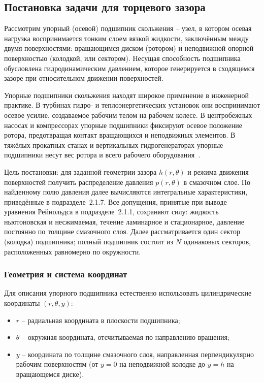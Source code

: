 \subsection{Постановка задачи для торцевого зазора}


Рассмотрим упорный (осевой) подшипник скольжения -- узел, в котором осевая нагрузка воспринимается тонким слоем вязкой жидкости, заключённым между двумя поверхностями: вращающимся диском (ротором) и неподвижной опорной поверхностью (колодкой, или сектором). Несущая способность подшипника обусловлена гидродинамическим давлением, которое генерируется в сходящемся зазоре при относительном движении поверхностей.

Упорные подшипники скольжения находят широкое применение в инженерной практике. В турбинах гидро- и теплоэнергетических установок они воспринимают осевое усилие, создаваемое рабочим телом на рабочем колесе. В центробежных насосах и компрессорах упорные подшипники фиксируют осевое положение ротора, предотвращая контакт вращающихся и неподвижных элементов. В тяжёлых прокатных станах и вертикальных гидрогенераторах упорные подшипники несут вес ротора и всего рабочего оборудования~\cite{hori2002,szeri1998}.

Цель постановки: для заданной геометрии зазора $h(r,\theta)$ и режима движения поверхностей получить распределение давления $p(r,\theta)$ в смазочном слое. По найденному полю давления далее вычисляются интегральные характеристики, приведённые в подразделе~2.1.7. Все допущения, принятые при выводе уравнения Рейнольдса в подразделе~2.1.1, сохраняют силу: жидкость ньютоновская и несжимаемая, течение ламинарное и стационарное, давление постоянно по толщине смазочного слоя. Далее рассматривается один сектор (колодка) подшипника; полный подшипник состоит из $N$ одинаковых секторов, расположенных равномерно по окружности.


\subsubsection*{Геометрия и система координат}

Для описания упорного подшипника естественно использовать цилиндрические координаты $(r, \theta, y)$:
\begin{itemize}
\item $r$ -- радиальная координата в плоскости подшипника;
\item $\theta$ -- окружная координата, отсчитываемая по направлению вращения;
\item $y$ -- координата по толщине смазочного слоя, направленная перпендикулярно рабочим поверхностям (от $y = 0$ на неподвижной колодке до $y = h$ на вращающемся диске).
\end{itemize}

